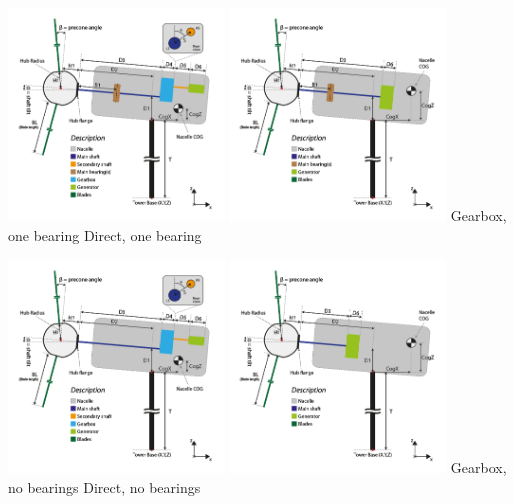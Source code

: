 \includegraphics[width=0.43\textwidth]{Figures/3b-TurbineDefinition5}\hfill
\includegraphics[width=0.43\textwidth]{Figures/3b-TurbineDefinition2}
\hspace*{0.1\textwidth} Gearbox, one bearing
\hspace*{0.3\textwidth} Direct, one bearing

\includegraphics[width=0.43\textwidth]{Figures/3b-TurbineDefinition6}\hfill
\includegraphics[width=0.43\textwidth]{Figures/3b-TurbineDefinition3}
\hspace*{0.1\textwidth} Gearbox, no bearings
\hspace*{0.3\textwidth} Direct, no bearings

